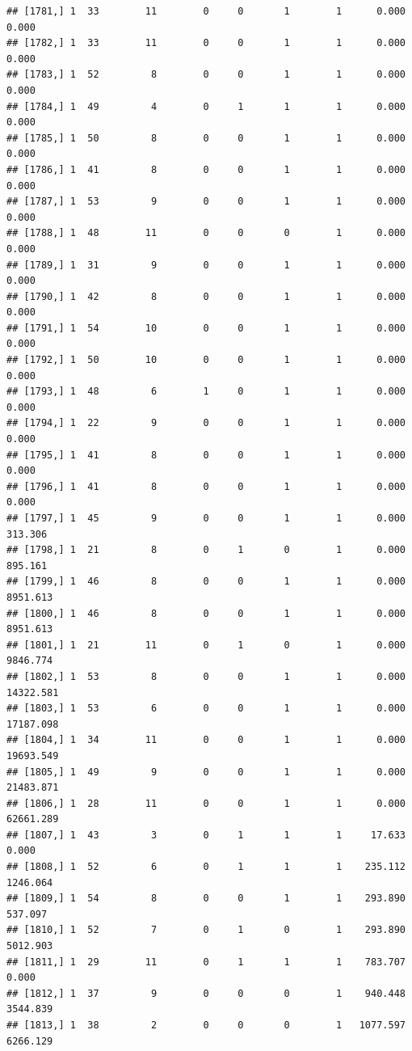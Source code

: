 \documentclass[
]{article}
\begin{document}
\begin{verbatim}
## [1781,] 1  33        11        0     0       1        1      0.000      0.000
## [1782,] 1  33        11        0     0       1        1      0.000      0.000
## [1783,] 1  52         8        0     0       1        1      0.000      0.000
## [1784,] 1  49         4        0     1       1        1      0.000      0.000
## [1785,] 1  50         8        0     0       1        1      0.000      0.000
## [1786,] 1  41         8        0     0       1        1      0.000      0.000
## [1787,] 1  53         9        0     0       1        1      0.000      0.000
## [1788,] 1  48        11        0     0       0        1      0.000      0.000
## [1789,] 1  31         9        0     0       1        1      0.000      0.000
## [1790,] 1  42         8        0     0       1        1      0.000      0.000
## [1791,] 1  54        10        0     0       1        1      0.000      0.000
## [1792,] 1  50        10        0     0       1        1      0.000      0.000
## [1793,] 1  48         6        1     0       1        1      0.000      0.000
## [1794,] 1  22         9        0     0       1        1      0.000      0.000
## [1795,] 1  41         8        0     0       1        1      0.000      0.000
## [1796,] 1  41         8        0     0       1        1      0.000      0.000
## [1797,] 1  45         9        0     0       1        1      0.000    313.306
## [1798,] 1  21         8        0     1       0        1      0.000    895.161
## [1799,] 1  46         8        0     0       1        1      0.000   8951.613
## [1800,] 1  46         8        0     0       1        1      0.000   8951.613
## [1801,] 1  21        11        0     1       0        1      0.000   9846.774
## [1802,] 1  53         8        0     0       1        1      0.000  14322.581
## [1803,] 1  53         6        0     0       1        1      0.000  17187.098
## [1804,] 1  34        11        0     0       1        1      0.000  19693.549
## [1805,] 1  49         9        0     0       1        1      0.000  21483.871
## [1806,] 1  28        11        0     0       1        1      0.000  62661.289
## [1807,] 1  43         3        0     1       1        1     17.633      0.000
## [1808,] 1  52         6        0     1       1        1    235.112   1246.064
## [1809,] 1  54         8        0     0       1        1    293.890    537.097
## [1810,] 1  52         7        0     1       0        1    293.890   5012.903
## [1811,] 1  29        11        0     1       1        1    783.707      0.000
## [1812,] 1  37         9        0     0       0        1    940.448   3544.839
## [1813,] 1  38         2        0     0       0        1   1077.597   6266.129

\end{verbatim}
\end{document}
